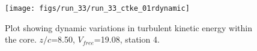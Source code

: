 \begin{figure}[H]
\centering
\texttt{[image: figs/run\_33/run\_33\_ctke\_01rdynamic]}
\caption{Plot showing dynamic variations in turbulent kinetic energy within the core. $z/c$=8.50, $V_{free}$=19.08, station 4.}
\label{fig:run_33_ctke_01rdynamic}
\end{figure}


